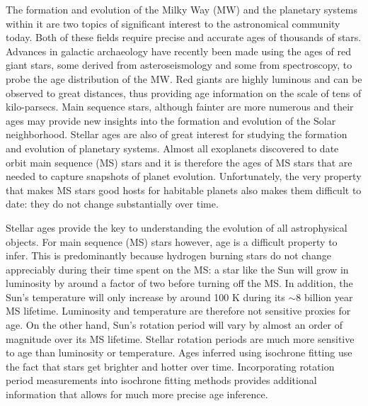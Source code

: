 
The formation and evolution of the Milky Way (MW) and the planetary systems
within it are two topics of significant interest to the astronomical community
today.
Both of these fields require precise and accurate ages of thousands of stars.
Advances in galactic archaeology have recently been made using the ages of
red giant stars, some derived from asteroseismology and some from
spectroscopy, to probe the age distribution of the MW.
Red giants are highly luminous and can be observed to great distances, thus
providing age information on the scale of tens of kilo-parsecs.
Main sequence stars, although fainter are more numerous and their ages may
provide new insights into the formation and evolution of the Solar
neighborhood.
Stellar ages are also of great interest for studying the formation and
evolution of planetary systems.
Almost all exoplanets discovered to date orbit main sequence (MS) stars and it
is therefore the ages of MS stars that are needed to capture snapshots of
planet evolution.
Unfortunately, the very property that makes MS stars good hosts for habitable
planets also makes them difficult to date: they do not change substantially
over time.

Stellar ages provide the key to understanding the evolution of all
astrophysical objects.
For main sequence (MS) stars however, age is a difficult property to infer.
This is predominantly because hydrogen burning stars do not change appreciably
during their time spent on the MS: a star like the Sun will grow in
luminosity by around a factor of two before turning off the MS.
In addition, the Sun's temperature will only increase by around 100 K during
its $\sim$8 billion year MS lifetime.
Luminosity and temperature are therefore not sensitive proxies for age.
On the other hand, Sun's rotation period will vary by almost an order of
magnitude over its MS lifetime.
Stellar rotation periods are much more sensitive to age than luminosity or
temperature.
Ages inferred using isochrone fitting use the fact that stars get brighter and
hotter over time.
Incorporating rotation period measurements into isochrone fitting methods
provides additional information that allows for much more precise age
inference.

